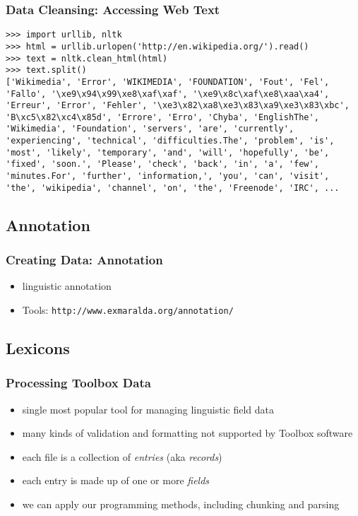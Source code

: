 \documentclass{beamer}             %
\begin{document}
\begin{frame}[fragile]
\frametitle{Data Cleansing: Accessing Web Text}

\scriptsize
\begin{verbatim}
>>> import urllib, nltk
>>> html = urllib.urlopen('http://en.wikipedia.org/').read()
>>> text = nltk.clean_html(html)
>>> text.split()
['Wikimedia', 'Error', 'WIKIMEDIA', 'FOUNDATION', 'Fout', 'Fel',
'Fallo', '\xe9\x94\x99\xe8\xaf\xaf', '\xe9\x8c\xaf\xe8\xaa\xa4',
'Erreur', 'Error', 'Fehler', '\xe3\x82\xa8\xe3\x83\xa9\xe3\x83\xbc',
'B\xc5\x82\xc4\x85d', 'Errore', 'Erro', 'Chyba', 'EnglishThe',
'Wikimedia', 'Foundation', 'servers', 'are', 'currently',
'experiencing', 'technical', 'difficulties.The', 'problem', 'is',
'most', 'likely', 'temporary', 'and', 'will', 'hopefully', 'be',
'fixed', 'soon.', 'Please', 'check', 'back', 'in', 'a', 'few',
'minutes.For', 'further', 'information,', 'you', 'can', 'visit',
'the', 'wikipedia', 'channel', 'on', 'the', 'Freenode', 'IRC', ...
\end{verbatim}
\end{frame}

\subsection{Annotation}

\begin{frame}[fragile]
\frametitle{Creating Data: Annotation}

\begin{itemize}
\item linguistic annotation
\item Tools: \verb|http://www.exmaralda.org/annotation/|
\end{itemize}
\end{frame}

\subsection{Lexicons}

\begin{frame}
\frametitle{Processing Toolbox Data}

\begin{itemize}
\item single most popular tool for managing linguistic field data
\item many kinds of validation and formatting not supported by Toolbox software
\item each file is a collection of \textit{entries} (aka
  \textit{records})
\item each entry is made up of one or more \textit{fields}
\item we can apply our programming methods, including chunking and parsing
\end{itemize}
\end{frame}
\end{document}
